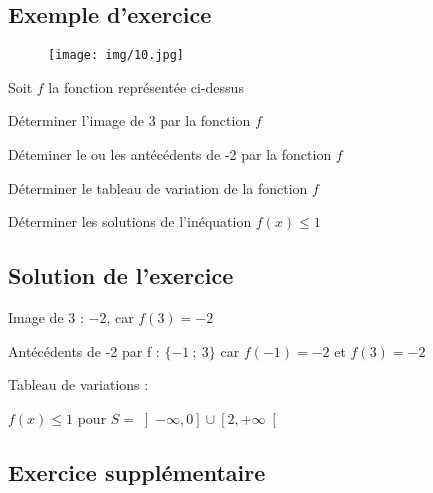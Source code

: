 \documentclass[a4paper,12pt]{article}
\begin{document}
\subsection*{Exemple d'exercice}

\begin{figure}[H]
  \centering
  \texttt{[image: img/10.jpg]}
\end{figure}

Soit $f$ la fonction représentée ci-dessus
\begin{compactenum}
  \item Déterminer l'image de 3 par la fonction $f$
  \item Déteminer le ou les antécédents de -2 par la fonction $f$
  \item Déterminer le tableau de variation de la fonction $f$
  \item Déterminer les solutions de l'inéquation $f(x) \leq 1$ 
\end{compactenum}

\vspace{1em}

\subsection*{Solution de l'exercice}

\begin{compactenum}
  \item Image de 3 : $-2$, car $f(3) = -2$
  \item Antécédents de -2 par f : $\{ -1 \ ;\ 3 \}$ car $f(-1) = -2$ et $f(3) = -2$
  \item Tableau de variations : 
  
  \begin{center}
    \end{center}

  \item $f(x) \leq 1$ pour $S = \left]-\infty, 0\right] \cup \left[2, +\infty\right[$

\end{compactenum}


\subsection*{Exercice supplémentaire}
\end{document}
